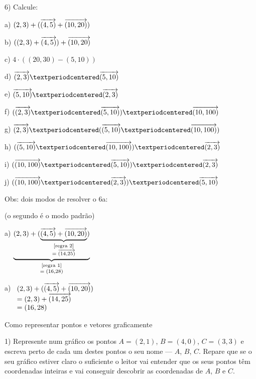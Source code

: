 \documentclass[oneside]{book}
\begin{document}
6) Calcule:

\begin{minipage}[t]{2.25in}

a) $(2,3)+(\V(4,5)+\V(10,20))$

b) $((2,3)+\V(4,5))+\V(10,20)$

c) $4·((20,30)-(5,10))$

d) $\V(2,3)·\V(5,10)$

e) $\V(5,10)·\V(2,3)$

f) $(\V(2,3)·\V(5,10))·\V(10,100)$

g) $\V(2,3)·(\V(5,10)·\V(10,100))$

h) $(\V(5,10)·\V(10,100))·\V(2,3)$

i) $(\V(10,100)·\V(5,10))·\V(2,3)$

j) $(\V(10,100)·\V(2,3))·\V(5,10)$

\end{minipage}
%
\begin{minipage}[t]{2in}

Obs: dois modos de resolver o 6a:

(o segundo é o modo padrão)

\msk

a)
$\unds {(2,3)+(\unds {\V(4,5)+\V(10,20)}
                     2
                     {=\;\V(14,25)}     )}
       1
       {=\;(16,28)}
$

\msk

a) $\begin{array}[t]{l}
      (2,3)+(\V(4,5)+\V(10,20)) \\
    = (2,3)+\V(14,25) \\
    = (16,28) \\
    \end{array}
   $

\end{minipage}


\newpage

%

 {Como representar pontos e vetores graficamente}

1) Represente num gráfico os pontos $A=(2,1)$, $B=(4,0)$, $C=(3,3)$ e
escreva perto de cada um destes pontos o seu nome --- $A$, $B$, $C$.
Repare que se o seu gráfico estiver claro o suficiente o leitor vai
entender que os seus pontos têm coordenadas inteiras e vai conseguir
descobrir as coordenadas de $A$, $B$ e $C$.
\end{document}
